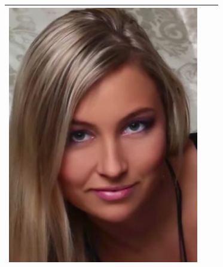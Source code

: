 \begin{longtable}{|c|c|c|}
\begin{minipage}{.29\textwidth}
    \includegraphics[width=\textwidth,height=\textheight,keepaspectratio]{images/match_body_res}
  \end{minipage} \\
    \hline
\end{longtable}
\pagebreak


